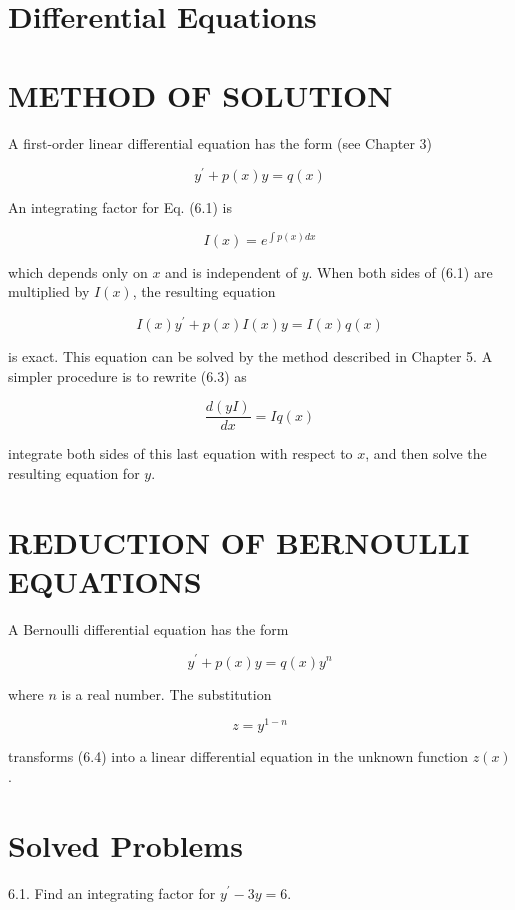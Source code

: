 \documentclass[10pt]{article}
\begin{document}
\section*{Differential Equations}
\section*{METHOD OF SOLUTION}
A first-order linear differential equation has the form (see Chapter 3)


\begin{equation*}
y^{\prime}+p(x) y=q(x) \tag{6.1}
\end{equation*}


An integrating factor for Eq. (6.1) is


\begin{equation*}
I(x)=e^{\int p(x) d x} \tag{6.2}
\end{equation*}


which depends only on $x$ and is independent of $y$. When both sides of (6.1) are multiplied by $I(x)$, the resulting equation


\begin{equation*}
I(x) y^{\prime}+p(x) I(x) y=I(x) q(x) \tag{6.3}
\end{equation*}


is exact. This equation can be solved by the method described in Chapter 5. A simpler procedure is to rewrite (6.3) as

$$
\frac{d(y I)}{d x}=I q(x)
$$

integrate both sides of this last equation with respect to $x$, and then solve the resulting equation for $y$.

\section*{REDUCTION OF BERNOULLI EQUATIONS}
A Bernoulli differential equation has the form


\begin{equation*}
y^{\prime}+p(x) y=q(x) y^{n} \tag{6.4}
\end{equation*}


where $n$ is a real number. The substitution


\begin{equation*}
z=y^{1-n} \tag{6.5}
\end{equation*}


transforms (6.4) into a linear differential equation in the unknown function $z(x)$.

\section*{Solved Problems}
6.1. Find an integrating factor for $y^{\prime}-3 y=6$.
\end{document}
